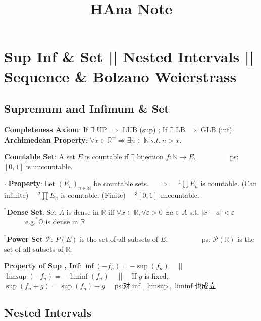 \documentclass[9pt]{article}
\title{HAna Note}
\author{}
\date{}
\newcommand{\ex}{{\tiny $^{^{^\oplus}}$}}
\begin{document}
\maketitle
\thispagestyle{fancy}
\vspace{-3.5cm}

\fontsize{10pt}{11pt}\selectfont
\setlength{\parindent}{0pt}

\section{Sup Inf \& Set || Nested Intervals || Sequence \& Bolzano Weierstrass}

\subsection{Supremum and Infimum \& Set}

\textbf{Completeness Axiom}: If $\exists$ UP $\Rightarrow$ LUB (sup) ; If $\exists$ LB $\Rightarrow$ GLB (inf). \hspace{20pt} \textbf{Archimedean Property}: $\forall x \in \mathbb{R}^+ \Rightarrow \exists n\in \mathbb{N} \ s.t. \ n>x.$

\textbf{Countable Set}: A set $E$ is countable if $\exists$ bijection $f:\mathbb{N}\to E$. \ \ \ \ \ \ \ \ \ ps: $[0,1]$ is uncountable.

$\cdot$ \textbf{Property}: Let $(E_n)_{n\in\mathbb{N}}$ be countable sets. \ \ $\Rightarrow$ \ \ $^1\bigcup E_n$ is countable. (Can infinite) \ \ $^2\prod E_n$ is countable. (Finite) \ \ $^3[0,1]$ uncountable.

\ex\textbf{Dense Set}: Set $A$ is dense in $\mathbb{R}$ iff $\forall x\in\mathbb{R},\forall\varepsilon>0 \  \ \exists a\in A$ s.t. $|x-a|<\varepsilon$ \ \ \ \ \ \ {\scriptsize e.g.\ex $\mathbb{Q}$ is dense in $\mathbb{R}$}

\ex\textbf{Power Set $\mathcal{P}$}: $P(E)$ is the set of all subsets of $E$. \ \ \ \ \ \ \ \ \ ps: $\mathcal{P}(\mathbb{R})$ is the set of all subsets of $\mathbb{R}$.

\textbf{Property of Sup , Inf}: {\footnotesize $\inf(-f_n)=-\sup(f_n)$ \ \ || \ \ $\limsup(-f_n)=-\liminf(f_n)$ \ \ || \ \ If $g$ is fixed, $\sup(f_n+g)=\sup(f_n)+g$ \ \ ps:对$\inf,\limsup,\liminf$也成立}


\subsection{Nested Intervals}
\end{document}
